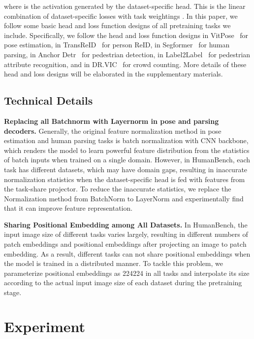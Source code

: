 \documentclass[10pt,twocolumn,letterpaper]{article}
\begin{document}
where  is the activation generated by the dataset-specific head.
This is the linear combination of dataset-specific losses  with task weightings . In this paper, we follow some basic head and loss function designs of all pretraining tasks we include. Specifically, we follow the head and loss function designs in VitPose~\cite{xu2022vitpose} for pose estimation, in TransReID~\cite{he2021transreid} for person ReID, in Segformer~\cite{xie2021segformer} for human parsing, in Anchor Detr~\cite{wang2022anchor} for pedestrian detection, in Label2Label~\cite{li2022label2label} for pedestrian attribute recognition, and in DR.VIC~\cite{han2022dr} for crowd counting. More details of these head and loss designs will be elaborated in the supplementary materials.

\subsection{Technical Details}
\noindent \textbf{Replacing all Batchnorm with Layernorm in pose and parsing decoders.} Generally, the original feature normalization method in pose estimation and human parsing tasks is batch normalization with CNN backbone, which renders the model to learn powerful feature distribution from the statistics of batch inputs when trained on a single domain. However, in HumanBench, each task has different datasets, which may have domain gaps, resulting in inaccurate normalization statistics when the dataset-specific head is fed with features from the task-share projector. To reduce the inaccurate statistics, we replace the Normalization method from BatchNorm\cite{ioffe2015batch} to LayerNorm\cite{ba2016layer} and experimentally find that it can improve feature representation. 

\noindent \textbf{Sharing Positional Embedding among All Datasets.} In HumanBench, the input image size of different tasks varies largely, resulting in different numbers of patch embeddings and positional embeddings after projecting an image to patch embedding. As a result, different tasks can not share positional embeddings when the model is trained in a distributed manner. To tackle this problem, we parameterize  positional embeddings as 224224 in all tasks and interpolate its size according to the actual input image size of each dataset during the pretraining stage.



\section{Experiment} \label{sec:exp}
\end{document}
